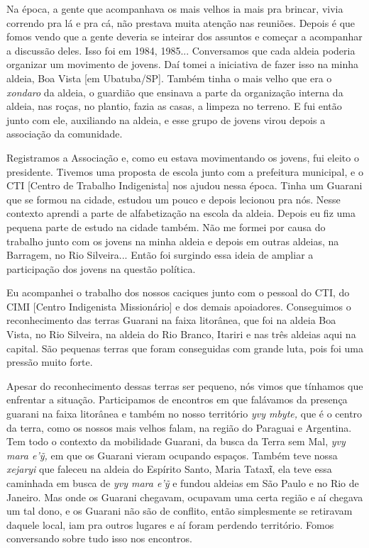 Na época, a gente que acompanhava os mais velhos ia mais pra brincar,
vivia correndo pra lá e pra cá, não prestava muita atenção nas reuniões.
Depois é que fomos vendo que a gente deveria se inteirar dos assuntos e
começar a acompanhar a discussão deles. Isso foi em 1984, 1985...
Conversamos que cada aldeia poderia organizar um movimento de jovens.
Daí tomei a iniciativa de fazer isso na minha aldeia, Boa Vista {[}em
Ubatuba/SP{]}. Também tinha o mais velho que era o \emph{xondaro} da
aldeia, o guardião que ensinava a parte da organização interna da
aldeia, nas roças, no plantio, fazia as casas, a limpeza no terreno. E
fui então junto com ele, auxiliando na aldeia, e esse grupo de jovens
virou depois a associação da comunidade.

Registramos a Associação e, como eu estava movimentando os jovens, fui
eleito o presidente. Tivemos uma proposta de escola junto com a
prefeitura municipal, e o CTI {[}Centro de Trabalho Indigenista{]} nos
ajudou nessa época. Tinha um Guarani que se formou na cidade, estudou um
pouco e depois lecionou pra nós. Nesse contexto aprendi a parte de
alfabetização na escola da aldeia. Depois eu fiz uma pequena parte de
estudo na cidade também. Não me formei por causa do trabalho junto com
os jovens na minha aldeia e depois em outras aldeias, na Barragem, no
Rio Silveira... Então foi surgindo essa ideia de ampliar a participação
dos jovens na questão política.

Eu acompanhei o trabalho dos nossos caciques junto com o pessoal do CTI,
do CIMI {[}Centro Indigenista Missionário{]} e dos demais apoiadores.
Conseguimos o reconhecimento das terras Guarani na faixa litorânea, que
foi na aldeia Boa Vista, no Rio Silveira, na aldeia do Rio Branco,
Itariri e nas três aldeias aqui na capital. São pequenas terras que
foram conseguidas com grande luta, pois foi uma pressão muito forte.

Apesar do reconhecimento dessas terras ser pequeno, nós vimos que
tínhamos que enfrentar a situação. Participamos de encontros em que
falávamos da presença guarani na faixa litorânea e também no nosso
território \emph{yvy mbyte,} que é o centro da terra, como os nossos
mais velhos falam, na região do Paraguai e Argentina. Tem todo o
contexto da mobilidade Guarani, da busca da Terra sem Mal, \emph{yvy
mara e'ỹ,} em que os Guarani vieram ocupando espaços. Também teve nossa
\emph{xejaryi} que faleceu na aldeia do Espírito Santo, Maria Tataxῖ,
ela teve essa caminhada em busca de \emph{yvy mara e'ỹ} e fundou aldeias
em São Paulo e no Rio de Janeiro. Mas onde os Guarani chegavam, ocupavam
uma certa região e aí chegava um tal dono, e os Guarani não são de
conflito, então simplesmente se retiravam daquele local, iam pra outros
lugares e aí foram perdendo território. Fomos conversando sobre tudo
isso nos encontros.

